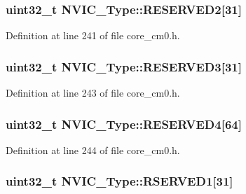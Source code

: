 \subsubsection[{\texorpdfstring{R\+E\+S\+E\+R\+V\+E\+D2}{RESERVED2}}]{\setlength{\rightskip}{0pt plus 5cm}uint32\+\_\+t N\+V\+I\+C\+\_\+\+Type\+::\+R\+E\+S\+E\+R\+V\+E\+D2\mbox{[}31\mbox{]}}\hypertarget{struct_n_v_i_c___type_ad65f1d8ada494ac3e4a01b5d8fc0e4af}{}\label{struct_n_v_i_c___type_ad65f1d8ada494ac3e4a01b5d8fc0e4af}


Definition at line 241 of file core\+\_\+cm0.\+h.

\subsubsection[{\texorpdfstring{R\+E\+S\+E\+R\+V\+E\+D3}{RESERVED3}}]{\setlength{\rightskip}{0pt plus 5cm}uint32\+\_\+t N\+V\+I\+C\+\_\+\+Type\+::\+R\+E\+S\+E\+R\+V\+E\+D3\mbox{[}31\mbox{]}}\hypertarget{struct_n_v_i_c___type_a9416f445547a08e24c3fdda87abb0fa6}{}\label{struct_n_v_i_c___type_a9416f445547a08e24c3fdda87abb0fa6}


Definition at line 243 of file core\+\_\+cm0.\+h.

\subsubsection[{\texorpdfstring{R\+E\+S\+E\+R\+V\+E\+D4}{RESERVED4}}]{\setlength{\rightskip}{0pt plus 5cm}uint32\+\_\+t N\+V\+I\+C\+\_\+\+Type\+::\+R\+E\+S\+E\+R\+V\+E\+D4\mbox{[}64\mbox{]}}\hypertarget{struct_n_v_i_c___type_a86c49460af6ebd251da0b08a0e9049f7}{}\label{struct_n_v_i_c___type_a86c49460af6ebd251da0b08a0e9049f7}


Definition at line 244 of file core\+\_\+cm0.\+h.

\subsubsection[{\texorpdfstring{R\+S\+E\+R\+V\+E\+D1}{RSERVED1}}]{\setlength{\rightskip}{0pt plus 5cm}uint32\+\_\+t N\+V\+I\+C\+\_\+\+Type\+::\+R\+S\+E\+R\+V\+E\+D1\mbox{[}31\mbox{]}}\hypertarget{struct_n_v_i_c___type_a97b6f852da06799a309457b83d4801d9}{}\label{struct_n_v_i_c___type_a97b6f852da06799a309457b83d4801d9}


